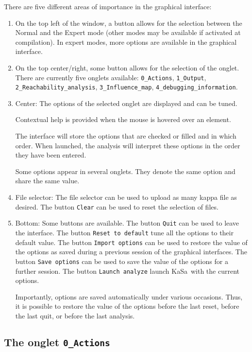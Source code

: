 \documentclass[11pt]{book}
\def\KaSa{\textsf{KaSa}}
\begin{document}
There are five different areas of importance in the graphical interface: 
\begin{enumerate}
\item On the top left of the window, a button allows for the selection between the Normal and the Expert mode (other modes may be available if activated at compilation). 
In expert modes, more options are available in the graphical interface.
\item On the top center/right, some button allows for the selection of the onglet. There are currently five onglets available: \texttt{0\_Actions}, \texttt{1\_Output}, \texttt{2\_Reachability\_analysis}, \texttt{3\_Influence\_map}, \texttt{4\_debugging\_information}. 
\item Center: The options of the selected onglet are displayed and can be tuned. 

Contextual help is provided when the mouse is hovered over an element. 

The interface will store the options that are checked or filled and in which order. 
When launched, the analysis will interpret these options in the order they have been entered. 

Some options appear in several onglets. They denote the same option and share the same value. 

\item File selector: The file selector can be used to upload as many kappa file as desired. The button \texttt{Clear} can be used to reset the selection of files.
\item Bottom: Some buttons are available. The button \texttt{Quit} can be used to leave the interface. The button \texttt{Reset to default} tune all the options to their default value. The button \texttt{Import options} can be used to restore the value of the options as saved during a previous session of the graphical interfaces. The button \texttt{Save options} can be used to save the value of the options for a further session. The button \texttt{Launch analyze} launch \KaSa\ with the current options. 

Importantly, options are saved automatically under various occasions. Thus, it is possible to restore the value of the options 
before the last reset, before the last quit, or before the last analysis. 
\end{enumerate}

\subsection{The onglet \texttt{0\_Actions}}
\end{document}
